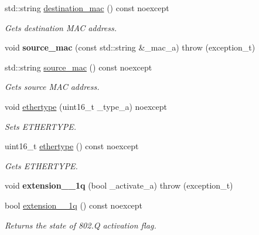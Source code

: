 \begin{DoxyCompactItemize}
\item 
std\+::string \hyperlink{class_n_h_1_1_protocols_1_1_raw_1_1ethernet__t_a0c8db6cceb97f4e5be350b1b2324fec3}{destination\+\_\+mac} () const noexcept
\begin{DoxyCompactList}\small\item\em Gets destination M\+A\+C address. \end{DoxyCompactList}\item 
\hypertarget{class_n_h_1_1_protocols_1_1_raw_1_1ethernet__t_a8aacb20928bf38d8c3ac8700c9adfd8f}{void {\bfseries source\+\_\+mac} (const std\+::string \&\+\_\+mac\+\_\+a)  throw (exception\+\_\+t)}\label{class_n_h_1_1_protocols_1_1_raw_1_1ethernet__t_a8aacb20928bf38d8c3ac8700c9adfd8f}

\item 
std\+::string \hyperlink{class_n_h_1_1_protocols_1_1_raw_1_1ethernet__t_a94f64400f2faa1e2835c42a4aa71c4da}{source\+\_\+mac} () const noexcept
\begin{DoxyCompactList}\small\item\em Gets source M\+A\+C address. \end{DoxyCompactList}\item 
void \hyperlink{class_n_h_1_1_protocols_1_1_raw_1_1ethernet__t_ac186b4b3cb148f984ffb750d6a28a4fe}{ethertype} (uint16\+\_\+t \+\_\+type\+\_\+a) noexcept
\begin{DoxyCompactList}\small\item\em Sets E\+T\+H\+E\+R\+T\+Y\+P\+E. \end{DoxyCompactList}\item 
uint16\+\_\+t \hyperlink{class_n_h_1_1_protocols_1_1_raw_1_1ethernet__t_a9c63dca6aabee027e34ef32b5c2590c3}{ethertype} () const noexcept
\begin{DoxyCompactList}\small\item\em Gets E\+T\+H\+E\+R\+T\+Y\+P\+E. \end{DoxyCompactList}\item 
\hypertarget{class_n_h_1_1_protocols_1_1_raw_1_1ethernet__t_a617d8893bd66ab306e6a4120f90ba40e}{void {\bfseries extension\+\_\+\_\+1q} (bool \+\_\+activate\+\_\+a)  throw (exception\+\_\+t)}\label{class_n_h_1_1_protocols_1_1_raw_1_1ethernet__t_a617d8893bd66ab306e6a4120f90ba40e}

\item 
bool \hyperlink{class_n_h_1_1_protocols_1_1_raw_1_1ethernet__t_a410928becc81554c8de89b369ea51cdf}{extension\+\_\+\_\+1q} () const noexcept
\begin{DoxyCompactList}\small\item\em Returns the state of 802.\+Q activation flag. \end{DoxyCompactList}\end{DoxyCompactItemize}
